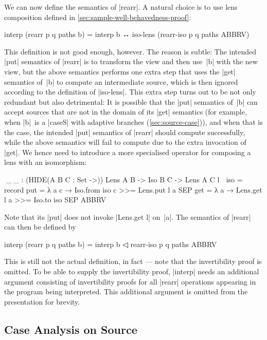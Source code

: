 \documentclass{sigplanconf}
\begin{document}
We can now define the semantics of |rearr|.
A natural choice is to use lens composition defined in \autoref{sec:sample-well-behavedness-proof}:
\begin{code}
interp (rearr p q paths b) =
  interp b ↔ iso-lens (rearr-iso p q paths ABBRV)
\end{code}
This definition is not good enough, however.
The reason is subtle:
The intended |put| semantics of |rearr| is to transform the view and then use~|b| with the new view, but the above semantics performs one extra step that uses the |get| semantics of~|b| to compute an intermediate source, which is then ignored according to the definition of |iso-lens|.
This extra step turns out to be not only redundant but also detrimental: It is possible that the |put| semantics of~|b| can accept sources that are not in the domain of its |get| semantics (for example, when |b|~is a |caseS| with adaptive branches (\autoref{sec:source-case})), and when that is the case, the intended |put| semantics of |rearr| should compute successfully, while the above semantics will fail to compute due to the extra invocation of |get|.
We hence need to introduce a more specialised operator for composing a lens with an isomorphism:
\begin{code}
^^^_◁_ : (HIDE({A B C : Set} ->)) Lens A B -> Iso B C -> Lens A C
l ◁ iso = record
  {    put  = λ a c → Iso.from iso c >>= Lens.put l a
  SEP  get  = λ a → Lens.get l a >>= Iso.to iso SEP ABBRV }
\end{code}
Note that its |put| does not invoke |Lens.get l| on~|a|.
The semantics of |rearr| can then be defined by
\begin{code}
interp (rearr p q paths b) = interp b ◁ rearr-iso p q paths ABBRV
\end{code}
This is still not the actual definition, in fact --- note that the invertibility proof is omitted.
To be able to supply the invertibility proof, |interp| needs an additional argument consisting of invertibility proofs for all |rearr| operations appearing in the program being interpreted.
This additional argument is omitted from the presentation for brevity.

\subsection{Case Analysis on Source}
\label{sec:source-case}
\end{document}
